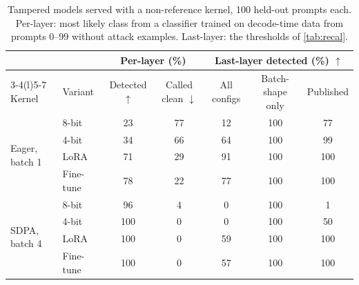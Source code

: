\documentclass[10pt,twocolumn]{article}
\newcommand{\best}[1]{\cellcolor{blue!8}#1}
\newcommand{\up}{$\uparrow$}
\newcommand{\down}{$\downarrow$}
\begin{document}
\begin{table}[!t]
\centering
\small
\caption{Tampered models served with a non-reference kernel, 100 held-out prompts each. Per-layer: most likely class from a classifier trained on decode-time data from prompts 0--99 without attack examples. Last-layer: the thresholds of \cref{tab:recal}.}
\label{tab:attack}
\begin{tabular}{@{}llccccc@{}}
\toprule
 & & \multicolumn{2}{c}{Per-layer (\%)} & \multicolumn{3}{c}{Last-layer detected (\%) \up} \\
\cmidrule(lr){3-4}\cmidrule(l){5-7}
Kernel & Variant & Detected \up & Called clean \down & All configs & Batch-shape only & Published \\
\midrule
\multirow{4}{*}{Eager, batch 1} & 8-bit     & 23 & 77 & 12 & 100 & 77  \\
                                & 4-bit     & 34 & 66 & 64 & 100 & 99  \\
                                & LoRA      & 71 & 29 & 91 & 100 & 100 \\
                                & Fine-tune & 78 & 22 & 77 & 100 & 100 \\
\midrule
\multirow{4}{*}{SDPA, batch 4}  & 8-bit     & \best{96}  & 4 & 0  & 100 & 1   \\
                                & 4-bit     & \best{100} & 0 & 0  & 100 & 50  \\
                                & LoRA      & \best{100} & 0 & 59 & 100 & 100 \\
                                & Fine-tune & \best{100} & 0 & 57 & 100 & 100 \\
\bottomrule
\end{tabular}
\end{table}
\end{document}
